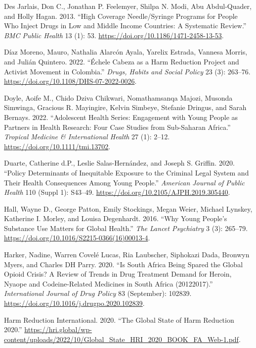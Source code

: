 \documentclass[
  letterpaper,
  DIV=11,
  numbers=noendperiod]{scrartcl}
\newlength{\cslhangindent}
\newenvironment{CSLReferences}[2] %
 {\begin{list}{}{%
  \setlength{\itemindent}{0pt}
  \setlength{\leftmargin}{0pt}
  \setlength{\parsep}{0pt}
  \ifodd #1
   \setlength{\leftmargin}{\cslhangindent}
   \setlength{\itemindent}{-1\cslhangindent}
  \fi
  \setlength{\itemsep}{#2\baselineskip}}}
 {\end{list}}
\begin{document}
\begin{CSLReferences}{1}{0}
Des Jarlais, Don C., Jonathan P. Feelemyer, Shilpa N. Modi, Abu
Abdul-Quader, and Holly Hagan. 2013. {``High Coverage Needle/Syringe
Programs for People Who Inject Drugs in Low and Middle Income Countries:
A Systematic Review.''} \emph{BMC Public Health} 13 (1): 53.
\url{https://doi.org/10.1186/1471-2458-13-53}.

Díaz Moreno, Mauro, Nathalia Alarcón Ayala, Yarelix Estrada, Vannesa
Morris, and Julián Quintero. 2022. {``Échele Cabeza as a Harm Reduction
Project and Activist Movement in Colombia.''} \emph{Drugs, Habits and
Social Policy} 23 (3): 263--76.
\url{https://doi.org/10.1108/DHS-07-2022-0026}.

Doyle, Aoife M., Chido Dziva Chikwari, Nomathamsanqa Majozi, Musonda
Simwinga, Gracious R. Mayingire, Kelvin Simbeye, Stefanie Dringus, and
Sarah Bernays. 2022. {``Adolescent Health Series: Engagement with Young
People as Partners in Health Research: Four Case Studies from
Sub-Saharan Africa.''} \emph{Tropical Medicine \& International Health}
27 (1): 2--12. \url{https://doi.org/10.1111/tmi.13702}.

Duarte, Catherine d.P., Leslie Salas-Hernández, and Joseph S. Griffin.
2020. {``Policy Determinants of Inequitable Exposure to the Criminal
Legal System and Their Health Consequences Among Young People.''}
\emph{American Journal of Public Health} 110 (Suppl 1): S43--49.
\url{https://doi.org/10.2105/AJPH.2019.305440}.

Hall, Wayne D., George Patton, Emily Stockings, Megan Weier, Michael
Lynskey, Katherine I. Morley, and Louisa Degenhardt. 2016. {``Why Young
People's Substance Use Matters for Global Health.''} \emph{The Lancet
Psychiatry} 3 (3): 265--79.
\url{https://doi.org/10.1016/S2215-0366(16)00013-4}.

Harker, Nadine, Warren Covelé Lucas, Ria Laubscher, Siphokazi Dada,
Bronwyn Myers, and Charles DH Parry. 2020. {``Is South Africa Being
Spared the Global Opioid Crisis? A Review of Trends in Drug Treatment
Demand for Heroin, Nyaope and Codeine-Related Medicines in South Africa
(2012{\textendash}2017).''} \emph{International Journal of Drug Policy}
83 (September): 102839.
\url{https://doi.org/10.1016/j.drugpo.2020.102839}.

Harm Reduction International. 2020. {``The Global State of Harm
Reduction 2020.''}
\url{https://hri.global/wp-content/uploads/2022/10/Global_State_HRI_2020_BOOK_FA_Web-1.pdf}.


\end{CSLReferences}
\end{document}
